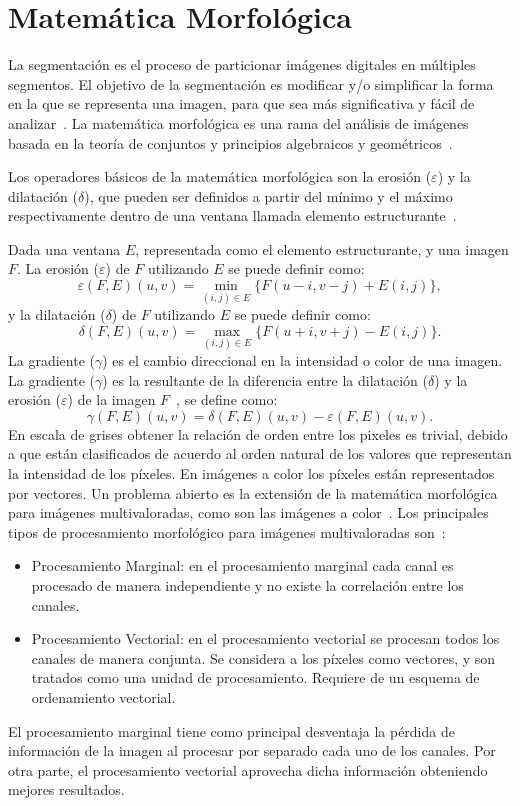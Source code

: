 \section{Matemática Morfológica}
La segmentación es el proceso de particionar imágenes digitales en múltiples segmentos. El objetivo de la segmentación es modificar y/o simplificar la forma en la que se representa una imagen, para que sea más significativa y fácil de analizar~\cite{wiki:segmentacion}. La matemática morfológica es una rama del análisis de imágenes basada en la teoría de conjuntos y principios algebraicos y geométricos~\cite{matheron2002birth}.

Los operadores básicos de la matemática morfológica son la erosión ($\varepsilon$) y la dilatación ($\delta$), que pueden ser definidos a partir del mínimo y el máximo respectivamente dentro de una ventana llamada elemento estructurante~\cite{noguera2014color}. 

Dada una ventana $E$, representada como el elemento estructurante, y una imagen $F$. 
  
   
La erosión ($\varepsilon$) de $F$ utilizando $E$ se puede definir como:
\begin{equation}
\varepsilon(F,E)(u,v)  = \min_{(i,j) \in E} \{F(u-i,v-j) + E(i,j) \},
\end{equation}
y la dilatación ($\delta$) de $F$ utilizando $E$ se puede definir como:
\begin{equation}
\delta(F,E)(u,v)  =  \max_{(i,j) \in E} \{F(u+i,v+j) - E(i,j) \}.
\end{equation}
La gradiente ($\gamma$) es el cambio direccional en la intensidad o color de una imagen. La gradiente ($\gamma$) es la resultante de la diferencia entre la dilatación ($\delta$) y la erosión ($\varepsilon$) de la imagen $F$~\cite{beucher}, se define como:
\begin{equation}
\gamma(F,E)(u,v) = \delta(F,E)(u,v) - \varepsilon(F,E)(u,v).
\end{equation}
En escala de grises obtener la relación de orden entre los pixeles es trivial, debido a que están clasificados de acuerdo al orden natural de los valores que representan la intensidad de los píxeles. En imágenes a color los píxeles están representados por vectores. Un problema abierto es la extensión de la matemática morfológica para imágenes multivaloradas, como son las imágenes a color~\cite{aptoula2007}.
Los principales tipos de procesamiento morfológico para imágenes multivaloradas son~\cite{aptoula2007}:
\begin{itemize}
\item Procesamiento Marginal: en el procesamiento marginal cada canal es procesado de manera independiente y no existe la correlación entre los canales.
\item Procesamiento Vectorial: en el procesamiento vectorial se procesan todos los canales de manera conjunta. Se considera a los píxeles como vectores, y son tratados como una unidad de procesamiento. Requiere de un esquema de ordenamiento vectorial.
\end{itemize}

El procesamiento marginal tiene como principal desventaja la pérdida de información de la imagen al procesar por separado cada uno de los canales. Por otra parte, el procesamiento vectorial aprovecha dicha información obteniendo mejores resultados.